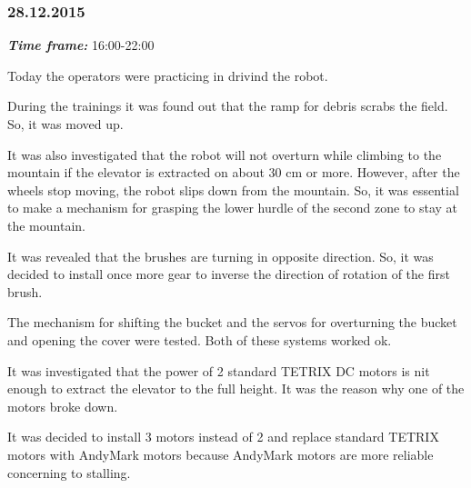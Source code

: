 \subsubsection{28.12.2015}
\textit{\textbf{Time frame:}} 16:00-22:00

Today the operators were practicing in drivind the robot.

During the trainings it was found out that the ramp for debris scrabs the field. So, it was moved up.

It was also investigated that the robot will not overturn while climbing to the mountain if the elevator is extracted on about 30 cm or more. However, after the wheels stop moving, the robot slips down from the mountain. So, it was essential to make a mechanism for grasping the lower hurdle of the second zone to stay at the mountain.

It was revealed that the brushes are turning in opposite direction. So, it was decided to install once more gear to inverse the direction of rotation of the first brush.

The mechanism for shifting the bucket and the servos for overturning the bucket and opening the cover were tested. Both of these systems worked ok.

It was investigated that the power of 2 standard TETRIX DC motors is nit enough to extract the elevator to the full height. It was the reason why one of the motors broke down.

It was decided to install 3 motors instead of 2 and replace standard TETRIX motors with AndyMark motors because AndyMark motors are more reliable concerning to stalling.
